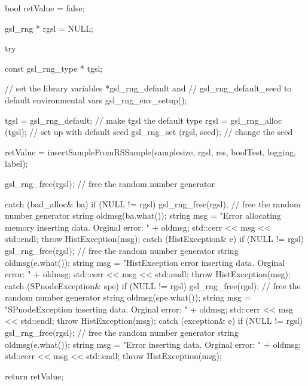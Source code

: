 \begin{DoxyCode}
{
    bool retValue = false;

    gsl_rng * rgsl = NULL;

    try {

        const gsl_rng_type * tgsl;

        // set the library variables *gsl_rng_default and
        // gsl_rng_default_seed to default environmental vars
        gsl_rng_env_setup();

        tgsl = gsl_rng_default; // make tgsl the default type
        rgsl = gsl_rng_alloc (tgsl); // set up with default seed
        gsl_rng_set (rgsl, seed); // change the seed

        retValue = insertSampleFromRSSample(samplesize, rgsl, rss, boolTest,
                logging, label);

        gsl_rng_free(rgsl); // free the random number generator
    }
    catch (bad_alloc& ba) {
        if (NULL != rgsl) gsl_rng_free(rgsl); // free the random number
       generator
        string oldmsg(ba.what());
        string msg = "Error allocating memory inserting data.  Orginal error: "
                                            + oldmsg;
        std::cerr << msg << std::endl;
        throw HistException(msg);
    }
    catch (HistException& e) {
        if (NULL != rgsl) gsl_rng_free(rgsl); // free the random number
       generator
        string oldmsg(e.what());
        string msg = "HistException error inserting data.  Orginal error: "
                                    + oldmsg;
        std::cerr << msg << std::endl;
        throw HistException(msg);
    }
    catch (SPnodeException& spe) {
        if (NULL != rgsl) gsl_rng_free(rgsl); // free the random number
       generator
        string oldmsg(spe.what());
        string msg = "SPnodeException inserting data.  Orginal error: " + 
      oldmsg;
        std::cerr << msg << std::endl;
        throw HistException(msg);
    }
    catch (exception& e) {
        if (NULL != rgsl) gsl_rng_free(rgsl); // free the random number
       generator
        string oldmsg(e.what());
        string msg = "Error inserting data.  Orginal error: " + oldmsg;
        std::cerr << msg << std::endl;
        throw HistException(msg);
    }

    return retValue;
}
\end{DoxyCode}
